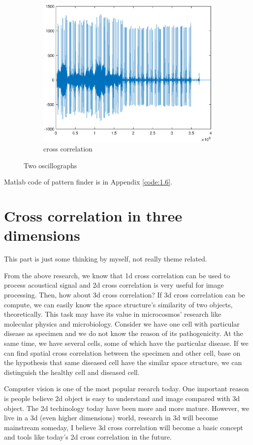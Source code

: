 \begin{figure}[h!]
\begin{subfigure}[t]{0.32\linewidth}
		\centering
		\includegraphics[width=1\linewidth]{figures/part1/crr_vis3.eps}
		\caption{cross correlation}
		\label{fig:crr_vis3}
	\end{subfigure}
	\caption{Two oscillographs}
	\label{fig:wave}
\end{figure} 

Matlab code of pattern finder is in Appendix \ref{code:1.6}.

\section{Cross correlation in three dimensions}

This part is just some thinking by myself, not really theme related. 

From the above research, we know that 1d cross correlation can be used to process acoustical signal and 2d cross correlation is very useful for image processing. Then, how about 3d cross correlation? If 3d cross correlation can be compute, we can easily know the space structure's similarity of two objects, theoretically. This task may have its value in microcosmos' research like molecular physics and microbiology. Consider we have one cell with particular disease as specimen and we do not know the reason of its pathogenicity. At the same time, we have several cells, some of which have the particular disease. If we can find spatial cross correlation between the specimen and other cell, base on the hypothesis that same diseased cell have the similar space structure, we can distinguish the healthy cell and diseased cell. 

Computer vision is one of the most popular reearch today. One important reason is people believe 2d object is easy to understand and image compared with 3d object. The 2d techinology today have been more and more mature. However, we live in a 3d (even higher dimensions) world, research in 3d will become mainstream someday, I believe 3d cross correlation will become a basic concept and tools like today's 2d cross correlation in the future.